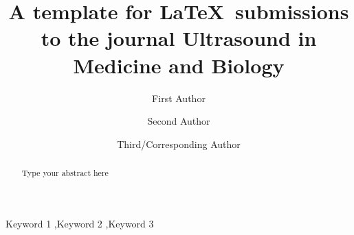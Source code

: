 \documentclass[review,authoryear,12pt]{elsarticle}
\begin{document}
\begin{frontmatter}



\title{A template for \LaTeX ~submissions to the journal Ultrasound in Medicine and Biology}






\author[Affil1]{First Author}
\author[Affil2]{Second Author}
\author[Affil1]{Third/Corresponding Author }
\address[Affil1]{Affiliation address 1}
\address[Affil2]{Affiliation address 2}


\begin{abstract}
Type your abstract here  
\end{abstract}


\begin{keyword}
Keyword 1 \sep Keyword 2 \sep Keyword 3
\end{keyword}

\end{frontmatter}
\end{document}

